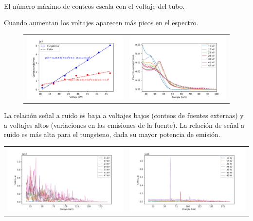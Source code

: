 \documentclass{sciposter}
\begin{document}
\begin{multicols}{3}
	El número máximo de conteos escala con el voltaje del tubo.
	
	Cuando aumentan los voltajes aparecen más picos en el espectro.
	
	\begin{figure}[h]
		\centering
		\begin{tabular}{cc}
				\includegraphics[width = 0.52\linewidth]{Figuras/Max_voltage.pdf}
				&
				\includegraphics[width = 0.52\linewidth]{Figuras/Both_Normed.pdf}
		\end{tabular}
	\end{figure}
	
	La relación señal a ruido es baja a voltajes bajos (conteos de fuentes externas) y a voltajes altos (variaciones en las emisiones de la fuente).
	La relación de señal a ruido es más alta para el tungsteno, dada su mayor potencia de emisión.
	
	\begin{table}[h]
		\centering
		\begin{tabular}{cc}
			\includegraphics[width = 0.52\linewidth]{Figuras/wsnr.pdf}
			&
			\includegraphics[width = 0.52\linewidth]{Figuras/agsnr.pdf}
		\end{tabular}
	\end{table}
	

\end{multicols}
\end{document}
